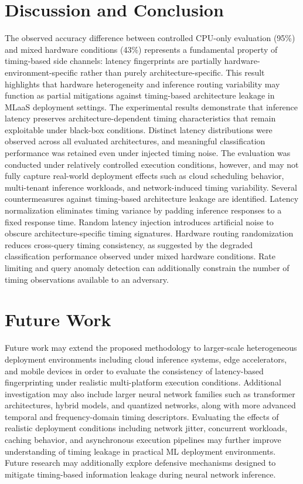 \documentclass[conference]{IEEEtran}
\begin{document}
\section{Discussion and Conclusion}
The observed accuracy difference between controlled CPU-only evaluation (95\%) and mixed hardware conditions (43\%) represents a fundamental property of timing-based side channels: latency fingerprints are partially hardware-environment-specific rather than purely architecture-specific. This result highlights that hardware heterogeneity and inference routing variability may function as partial mitigations against timing-based architecture leakage in MLaaS deployment settings.
The experimental results demonstrate that inference latency preserves architecture-dependent timing characteristics that remain exploitable under black-box conditions. Distinct latency distributions were observed across all evaluated architectures, and meaningful classification performance was retained even under injected timing noise. The evaluation was conducted under relatively controlled execution conditions, however, and may not fully capture real-world deployment effects such as cloud scheduling behavior, multi-tenant inference workloads, and network-induced timing variability.
Several countermeasures against timing-based architecture leakage are identified. Latency normalization eliminates timing variance by padding inference responses to a fixed response time. Random latency injection introduces artificial noise to obscure architecture-specific timing signatures. Hardware routing randomization reduces cross-query timing consistency, as suggested by the degraded classification performance observed under mixed hardware conditions. Rate limiting and query anomaly detection can additionally constrain the number of timing observations available to an adversary.

\section{Future Work}

Future work may extend the proposed methodology to larger-scale heterogeneous deployment environments including cloud inference systems, edge accelerators, and mobile devices in order to evaluate the consistency of latency-based fingerprinting under realistic multi-platform execution conditions. Additional investigation may also include larger neural network families such as transformer architectures, hybrid models, and quantized networks, along with more advanced temporal and frequency-domain timing descriptors. Evaluating the effects of realistic deployment conditions including network jitter, concurrent workloads, caching behavior, and asynchronous execution pipelines may further improve understanding of timing leakage in practical ML deployment environments. Future research may additionally explore defensive mechanisms designed to mitigate timing-based information leakage during neural network inference.
\end{document}
